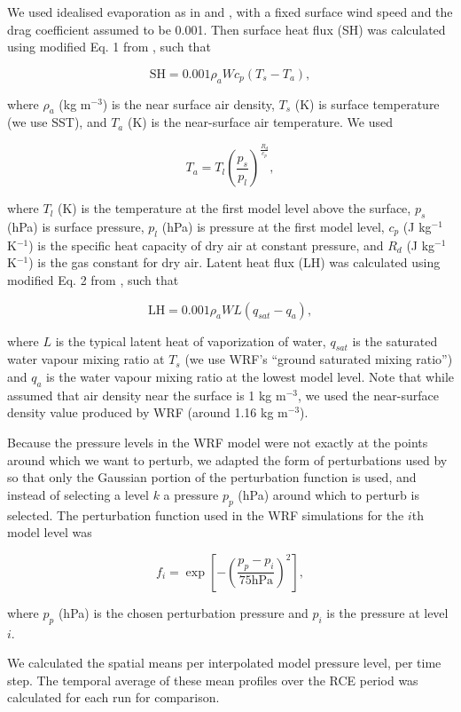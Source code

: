 \documentclass[draft]{agujournal2019}
\begin{document}
We used idealised evaporation as in  and
, with a fixed surface wind speed and the drag
coefficient assumed to be 0.001. Then surface heat flux (SH) was calculated
using modified Eq. 1 from , such that

$$
\textrm{SH} = 0.001 \rho_a W c_p (T_s - T_a),
$$

\noindent where $\rho_a$ (kg m$^{-3}$) is the near surface air density, $T_s$
(K) is surface temperature (we use SST), and $T_a$ (K) is the near-surface air
temperature. We used 

$$
T_a = T_l \left(\frac{p_s}{p_l}\right)^{\frac{R_d}{c_p}},
$$

\noindent where $T_l$ (K) is the temperature at the first model level above the
surface, $p_s$ (hPa) is surface pressure, $p_l$ (hPa) is pressure at the first
model level, $c_p$ (J kg$^{-1}$ K$^{-1}$) is the specific heat capacity of dry
air at constant pressure, and $R_d$ (J kg$^{-1}$ K$^{-1}$) is the gas constant
for dry air. Latent heat flux (LH) was calculated using modified Eq. 2 from
, such that

$$
\textrm{LH} = 0.001 \rho_a W L (q_{sat} - q_a),
$$

\noindent where $L$ is the typical latent heat of vaporization of water,
$q_{sat}$ is the saturated water vapour mixing ratio at $T_s$ (we use WRF's
``ground saturated mixing ratio'') and $q_a$ is the water vapour mixing ratio at
the lowest model level. Note that while  assumed that air
density near the surface is 1 kg m$^{-3}$, we used the near-surface density
value produced by WRF (around 1.16 kg m$^{-3}$).

Because the pressure levels in the WRF model were not exactly at the points
around which we want to perturb, we adapted the form of perturbations used by
 so that only the Gaussian portion of the perturbation
function is used, and instead of selecting a level $k$ a pressure $p_p$ (hPa)
around which to perturb is selected. The perturbation function used in the WRF
simulations for the $i$th model level was

$$
f_i = \exp\left[ - \left( \frac{p_p - p_i}{75 \textrm{hPa}}\right)^2 \right],
$$

\noindent where $p_p$ (hPa) is the chosen perturbation pressure and $p_i$ is the
pressure at level $i$.

We calculated the spatial means per interpolated model pressure level, per time
step. The temporal average of these mean profiles over the RCE period was
calculated for each run for comparison.
\end{document}
